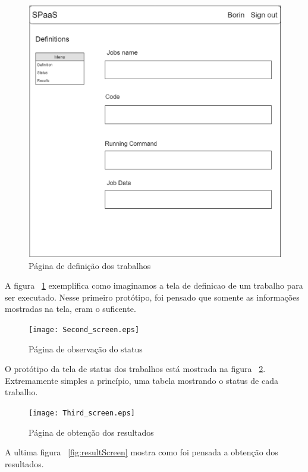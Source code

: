\documentclass[11pt,twoside]{article}
\begin{document}
\begin{figure}[!h]
  \centering
  \includegraphics[scale=0.2]{First_screen.eps}
  \caption{Página de definição dos trabalhos}
  \label{fig:definitionScreen}
\end{figure}


A figura ~\ref{fig:definitionScreen} exemplifica como imaginamos a tela de definicao de um trabalho para ser executado. Nesse primeiro protótipo, foi pensado que somente 
as informações mostradas na tela, eram o suficente.

\begin{figure}[!h]
  \centering
  \texttt{[image: Second\_screen.eps]}
  \caption{Página de observação do status}
  \label{fig:statusScreen}
\end{figure}


O protótipo da tela de status dos trabalhos está mostrada na figura ~\ref{fig:statusScreen}. Extremamente simples a princípio, uma tabela mostrando o status de cada trabalho. 

\begin{figure}[!h]
  \centering
  \texttt{[image: Third\_screen.eps]}
  \caption{Página de obtenção dos resultados}
  \label{fig:resultsScreen}
\end{figure}

A ultima figura ~\ref{fig:resultScreen} mostra como foi pensada a obtenção dos resultados.
\end{document}
